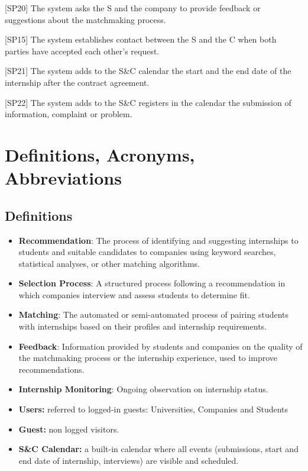 {[}SP20{]} The system asks the S and the company to provide feedback or
suggestions about the matchmaking process.

{[}SP15{]} The system establishes contact between the S and the C when
both parties have accepted each other's request.

{[}SP21{]} The system adds to the S\&C calendar the start and the end
date of the internship after the contract agreement.

{[}SP22{]} The system adds to the S\&C registers in the calendar the
submission of information, complaint or problem.

\section{Definitions, Acronyms, Abbreviations}
\label{sec:definition_acronyms_abbreviations}%

\subsection{Definitions}
\label{subsec:definitions}%

\begin{itemize}
\item
  \textbf{Recommendation}: The process of identifying and suggesting
  internships to students and suitable candidates to companies using
  keyword searches, statistical analyses, or other matching algorithms.
\item
  \textbf{Selection Process}: A structured process following a
  recommendation in which companies interview and assess students to
  determine fit.
\item
  \textbf{Matching}: The automated or semi-automated process of pairing
  students with internships based on their profiles and internship
  requirements.
\item
  \textbf{Feedback}: Information provided by students and companies on
  the quality of the matchmaking process or the internship experience,
  used to improve recommendations.
\item
  \textbf{Internship Monitoring}: Ongoing observation on internship
  status.
\item
  \textbf{Users:} referred to logged-in guests: Universities, Companies
  and Students
\item
  \textbf{Guest:} non logged visitors.
\item
  \textbf{S\&C Calendar:} a built-in calendar where all events
  (submissions, start and end date of internship, interviews) are
  visible and scheduled.~
\end{itemize}

